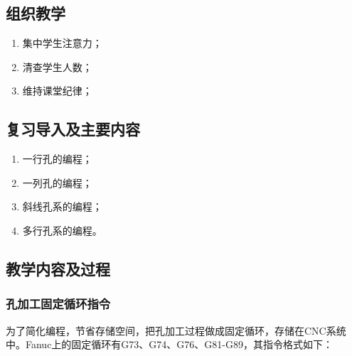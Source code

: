 \jxhj{%
	}

\makeshouye %

\subsection{组织教学}
\begin{enumerate}[\hspace{2em}1、]
	\item 集中学生注意力；
	\item 清查学生人数；
	\item 维持课堂纪律；
\end{enumerate}

\subsection{复习导入及主要内容}
\begin{enumerate}[1、]
\item 一行孔的编程；
\item 一列孔的编程；
\item 斜线孔系的编程；
\item 多行孔系的编程。
\end{enumerate}

\subsection{教学内容及过程}
\subsubsection{孔加工固定循环指令}
为了简化编程，节省存储空间，把孔加工过程做成固定循环，存储在CNC系统中。Fanuc上的固定循环有G73、G74、G76、G81-G89，其指令格式如下：

